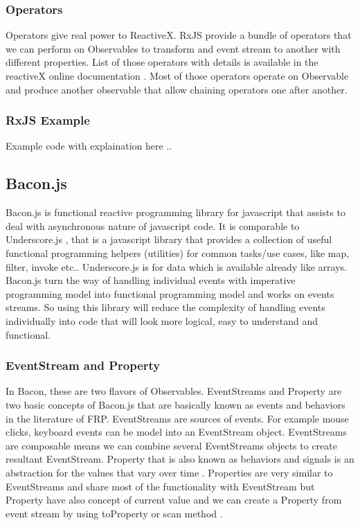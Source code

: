 \subsubsection{Operators}
Operators give real power to ReactiveX. RxJS provide a bundle of operators that we can perform on Observables to transform and event stream to another with different properties. List of those operators with details is available in the reactiveX online documentation \citep{reactivexOperators}.
Most of those operators operate on Observable and produce another observable that allow chaining operators one after another.

\subsubsection{RxJS Example}
Example code with explaination here ..

\subsection{Bacon.js}
Bacon.js is functional reactive programming library for javascript that assists to deal with asynchronous nature of javascript code. It is comparable to Underscore.js \citep{Underscorejs}, that is a javascript library that provides a collection of useful functional programming helpers (utilities) for common tasks/use cases, like map, filter, invoke etc..
Underscore.js is for data which is available already like arrays. Bacon.js turn the way of handling individual events with imperative programming model into functional programming model and works on events streams. So using this library will reduce the complexity of handling events individually into code that will look more logical, easy to understand and functional.

\subsubsection{EventStream and Property}
In Bacon, these are two flavors of Observables. EventStreams and Property are two basic concepts of Bacon.js that are basically known as events and behaviors in the literature of FRP.
EventStreams are sources of events. For example mouse clicks, keyboard events can be model into an EventStream object. EventStreams are composable means we can combine several EventStreams objects to create resultant EventStream.
Property that is also known as behaviors and signals is an abstraction for the values that vary over time \citep{GithubFRP}.
Properties are very similar to EventStreams and share most of the functionality with EventStream but Property have also concept of current value and we can create a Property from event stream by using toProperty or scan method \citep{BaconProperty}.

